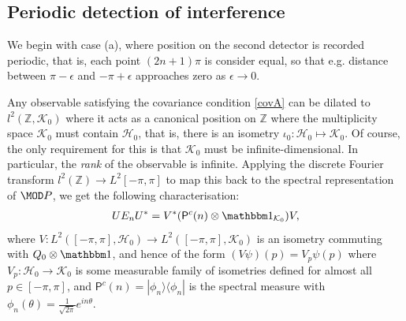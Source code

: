 \subsection{Periodic detection of interference}

We begin with case (a), where position on the second detector is recorded periodic, that is, each point $(2n+1)\pi$ is consider equal, so that e.g. distance between $\pi-\epsilon$ and $-\pi+\epsilon$ approaches zero as $\epsilon\rightarrow 0$.

Any observable satisfying the covariance condition \eqref{covA} can be dilated to $l^2(\mathbb Z, \mathcal K_0)$ where it acts as a canonical position on $\mathbb Z$ \cite{} where the multiplicity space $\mathcal K_0$ must contain $\mathcal H_0$, that is, there is an isometry $\iota_0:\mathcal H_0\mapsto \mathcal K_0$. Of course, the only requirement for this is that $\mathcal K_0$ must be infinite-dimensional. In particular, the \emph{rank} of the observable \cite{JP} is infinite. Applying the discrete Fourier transform $l^2(\mathbb Z)\to L^2[-\pi,\pi]$ to map this back to the spectral representation of $\MOD P$, we get the following characterisation:
\newcommand{\Pc}{\mathsf P^c}
\newcommand{\Qd}{Q_d}
\begin{align}
UE_nU^* = V^* (\Pc(n)\otimes \id_{\mathcal K_0})V,
\end{align}
where $V:L^2([-\pi,\pi],\mathcal H_0)\to L^2([-\pi,\pi],\mathcal K_0)$ is an isometry commuting with $Q_0\otimes \id$, and hence of the form $(V\psi)(p) = V_p\psi(p)$ where $V_p:\mathcal H_0\to \mathcal K_0$ is some measurable family of isometries defined for almost all $p\in [-\pi,\pi]$, and $\Pc(n)=|\phi_n\rangle\langle \phi_n|$ is the spectral measure with $\phi_n(\theta) = \frac {1}{\sqrt{2\pi}} e^{in\theta}$.

